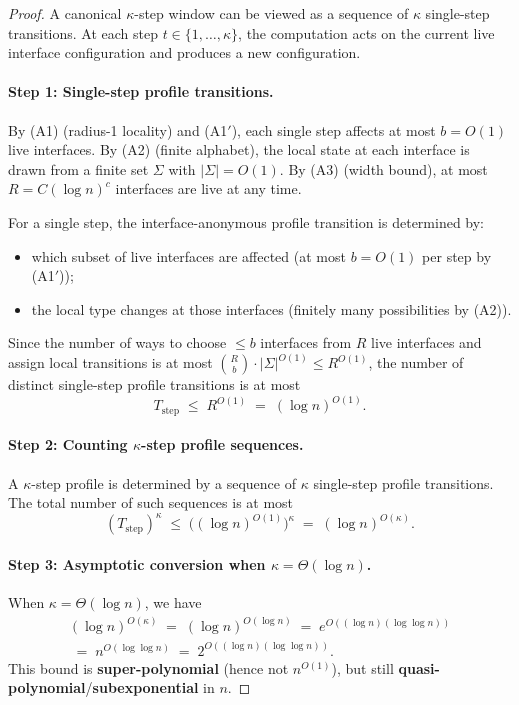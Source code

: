 \documentclass[12pt]{article}
\theoremstyle{definition}
\theoremstyle{remark}
\begin{document}
\begin{proof}
A canonical $\kappa$-step window can be viewed as a sequence of $\kappa$ single-step transitions.
At each step $t\in\{1,\dots,\kappa\}$, the computation acts on the current live interface
configuration and produces a new configuration.

\paragraph{Step 1: Single-step profile transitions.}
By (A1) (radius-1 locality) and (A1$'$), each single step affects at most $b=O(1)$
live interfaces. By (A2) (finite alphabet), the local state at each interface is drawn
from a finite set $\Sigma$ with $|\Sigma|=O(1)$. By (A3) (width bound), at most
$R=C(\log n)^c$ interfaces are live at any time.

For a single step, the interface-anonymous profile transition is determined by:
\begin{itemize}
\item which subset of live interfaces are affected (at most $b=O(1)$ per step by (A1$'$));
\item the local type changes at those interfaces (finitely many possibilities by (A2)).
\end{itemize}
Since the number of ways to choose $\le b$ interfaces from $R$ live interfaces and
assign local transitions is at most $\binom{R}{b}\cdot |\Sigma|^{O(1)} \le R^{O(1)}$,
the number of distinct single-step profile transitions is at most
\[
T_{\mathrm{step}} \;\le\; R^{O(1)} \;=\; (\log n)^{O(1)}.
\]

\paragraph{Step 2: Counting $\kappa$-step profile sequences.}
A $\kappa$-step profile is determined by a sequence of $\kappa$ single-step profile transitions.
The total number of such sequences is at most
\[
(T_{\mathrm{step}})^{\kappa} \;\le\; \bigl((\log n)^{O(1)}\bigr)^{\kappa} \;=\; (\log n)^{O(\kappa)}.
\]

\paragraph{Step 3: Asymptotic conversion when $\kappa=\Theta(\log n)$.}
When $\kappa=\Theta(\log n)$, we have
\begin{gather*}
(\log n)^{O(\kappa)} \;=\; (\log n)^{O(\log n)} \;=\; e^{O((\log n)(\log\log n))} \\
\;=\; n^{O(\log\log n)} \;=\; 2^{O((\log n)(\log\log n))}.
\end{gather*}
This bound is \textbf{super-polynomial} (hence not $n^{O(1)}$), but still
\textbf{quasi-polynomial}/\textbf{subexponential} in $n$.
\end{proof}
\end{document}
